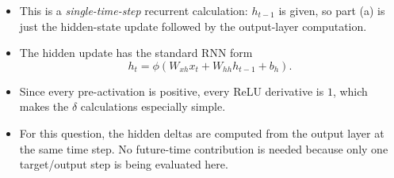 \documentclass[11pt]{article}
\begin{document}
\begin{itemize}
    \item This is a \emph{single-time-step} recurrent calculation: \(h_{t-1}\) is
    given, so part (a) is just the hidden-state update followed by the output-layer
    computation.
    \item The hidden update has the standard RNN form
    \[
        h_t=\phi(W_{xh}x_t+W_{hh}h_{t-1}+b_h).
    \]
    \item Since every pre-activation is positive, every ReLU derivative is \(1\),
    which makes the \(\delta\) calculations especially simple.
    \item For this question, the hidden deltas are computed from the output layer at
    the same time step. No future-time contribution is needed because only one
    target/output step is being evaluated here.
\end{itemize}
\end{document}
